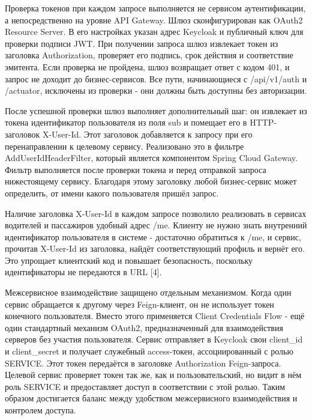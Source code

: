 {  \par \redline Проверка токенов при каждом запросе выполняется не сервисом аутентификации, а непосредственно на уровне API Gateway. Шлюз сконфигурирован как OAuth2 Resource Server. В его настройках указан адрес Keycloak и публичный ключ для проверки подписи JWT. При получении запроса шлюз извлекает токен из заголовка Authorization, проверяет его подпись, срок действия и соответствие эмитента. Если проверка не пройдена, шлюз возвращает ответ с кодом 401, и запрос не доходит до бизнес-сервисов. Все пути, начинающиеся с /api/v1/auth и /actuator, исключены из проверки - они должны быть доступны без авторизации.

  \par \redline После успешной проверки шлюз выполняет дополнительный шаг: он извлекает из токена идентификатор пользователя из поля sub и помещает его в HTTP-заголовок X-User-Id. Этот заголовок добавляется к запросу при его перенаправлении к целевому сервису. Реализовано это в фильтре AddUserIdHeaderFilter, который является компонентом Spring Cloud Gateway. Фильтр выполняется после проверки токена и перед отправкой запроса нижестоящему сервису. Благодаря этому заголовку любой бизнес-сервис может определить, от имени какого пользователя пришёл запрос.

  \par \redline Наличие заголовка X-User-Id в каждом запросе позволило реализовать в сервисах водителей и пассажиров удобный адрес /me. Клиенту не нужно знать внутренний идентификатор пользователя в системе - достаточно обратиться к /me, и сервис, прочитав X-User-Id из заголовка, найдёт соответствующий профиль и вернёт его. Это упрощает клиентский код и повышает безопасность, поскольку идентификаторы не передаются в URL [4].

  \par \redline Межсервисное взаимодействие защищено отдельным механизмом. Когда один сервис обращается к другому через Feign-клиент, он не использует токен конечного пользователя. Вместо этого применяется Client Credentials Flow - ещё один стандартный механизм OAuth2, предназначенный для взаимодействия серверов без участия пользователя. Сервис отправляет в Keycloak свои client\_id и client\_secret и получает служебный access-токен, ассоциированный с ролью SERVICE. Этот токен передаётся в заголовке Authorization Feign-запроса. Целевой сервис проверяет токен так же, как и пользовательский, но видит в нём роль SERVICE и предоставляет доступ в соответствии с этой ролью. Таким образом достигается баланс между удобством межсервисного взаимодействия и контролем доступа.

  \par
}

